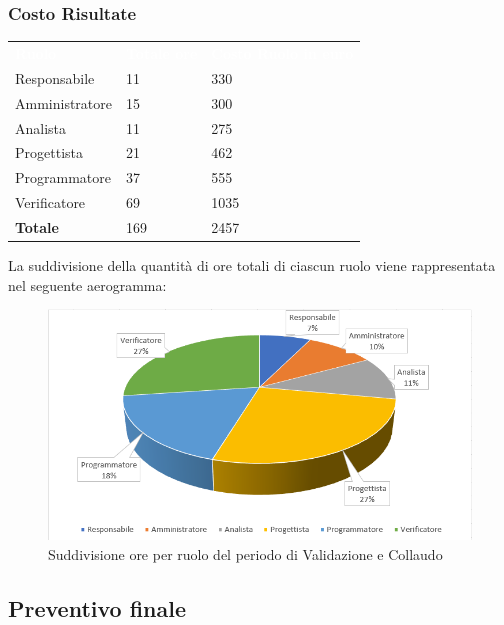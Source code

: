 \subsubsection{Costo Risultate}
{
	\renewcommand{\arraystretch}{2}
	\centering
	\begin{longtable}{ C{3cm} C{2cm} C{4cm}}
		\textcolor{white}{\textbf{Ruolo}} & \textcolor{white}{\textbf{Totale ore}} & \textcolor{white}{\textbf{Costo Ruolo in euro}}\\	
        
        Responsabile & 11 & 330\\
        Amministratore & 15 & 300 \\
        Analista & 11 & 275\\
        Progettista & 21 & 462\\
        Programmatore & 37 & 555\\
        Verificatore & 69 & 1035\\
        \textbf{Totale} & 169 & 2457\\
		
	\end{longtable}
}

La suddivisione della quantità di ore totali di ciascun ruolo viene rappresentata nel seguente aerogramma:

\begin{figure}[h]
	\centering
	\includegraphics[scale=2.5]{sezioni/Aerogrammi/AerogrammaProgettArchitetturale.png}
	\caption{Suddivisione ore per ruolo del periodo di Validazione e Collaudo}
\end{figure}


\clearpage
\subsection{Preventivo finale}
